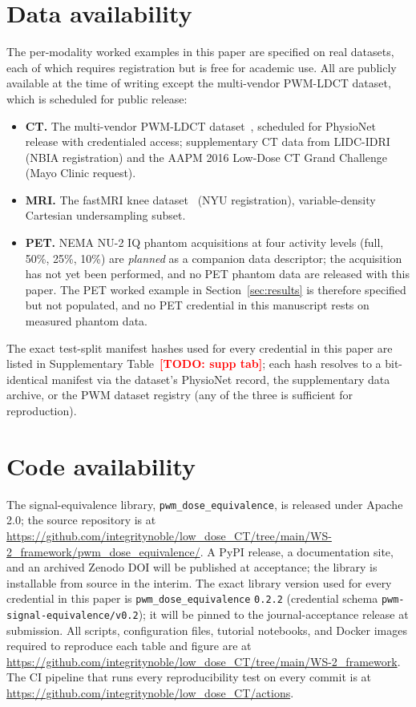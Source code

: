 \documentclass[twoside,11pt]{article}
\newcommand{\todo}[1]{\textcolor{red}{\textbf{[TODO: #1]}}}
\begin{document}
\section{Data availability}

The per-modality worked examples in this paper are specified on real datasets, each of which requires registration but is free for academic use. All are publicly available at the time of writing except the multi-vendor PWM-LDCT dataset, which is scheduled for public release:

\begin{itemize}
    \item \textbf{CT.} The multi-vendor PWM-LDCT dataset~\citep{ws1dataset}, scheduled for PhysioNet release with credentialed access; supplementary CT data from LIDC-IDRI~\citep{lidc_idri} (NBIA registration) and the AAPM 2016 Low-Dose CT Grand Challenge~\citep{aapm2016challenge} (Mayo Clinic request).
    \item \textbf{MRI.} The fastMRI knee dataset~\citep{fastmri} (NYU registration), variable-density Cartesian undersampling subset.
    \item \textbf{PET.} NEMA NU-2 IQ phantom acquisitions at four activity levels (full, 50\%, 25\%, 10\%) are \emph{planned} as a companion data descriptor; the acquisition has not yet been performed, and no PET phantom data are released with this paper. The PET worked example in Section~\ref{sec:results} is therefore specified but not populated, and no PET credential in this manuscript rests on measured phantom data.
\end{itemize}

The exact test-split manifest hashes used for every credential in this paper are listed in Supplementary Table~\todo{supp tab}; each hash resolves to a bit-identical manifest via the dataset's PhysioNet record, the supplementary data archive, or the PWM dataset registry (any of the three is sufficient for reproduction).

\section{Code availability}

The signal-equivalence library, \texttt{pwm\_dose\_equivalence}, is released under Apache 2.0; the source repository is at \url{https://github.com/integritynoble/low_dose_CT/tree/main/WS-2_framework/pwm_dose_equivalence/}. A PyPI release, a documentation site, and an archived Zenodo DOI will be published at acceptance; the library is installable from source in the interim. The exact library version used for every credential in this paper is \texttt{pwm\_dose\_equivalence} \texttt{0.2.2} (credential schema \texttt{pwm-signal-equivalence/v0.2}); it will be pinned to the journal-acceptance release at submission. All scripts, configuration files, tutorial notebooks, and Docker images required to reproduce each table and figure are at \url{https://github.com/integritynoble/low_dose_CT/tree/main/WS-2_framework}. The CI pipeline that runs every reproducibility test on every commit is at \url{https://github.com/integritynoble/low_dose_CT/actions}.
\end{document}
